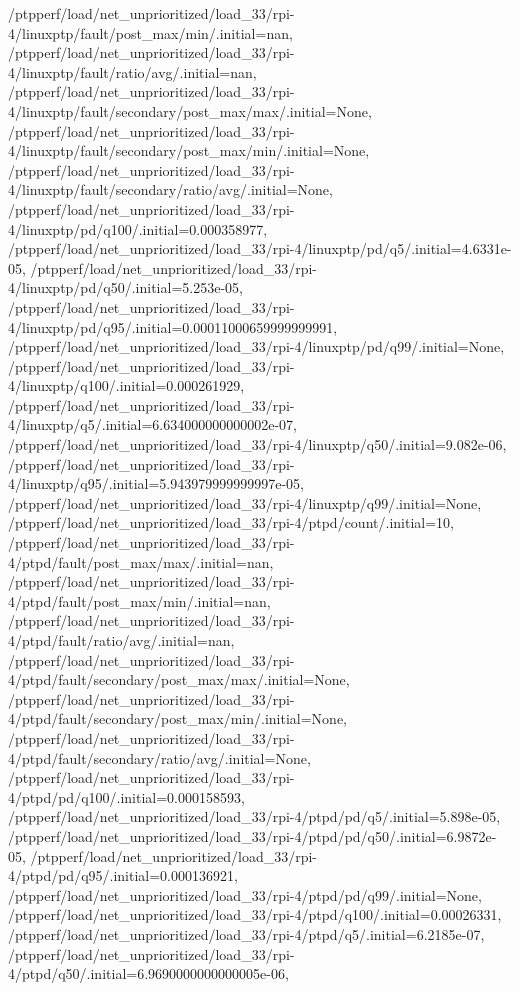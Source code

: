 {    /ptpperf/load/net_unprioritized/load_33/rpi-4/linuxptp/fault/post_max/min/.initial=nan,
    /ptpperf/load/net_unprioritized/load_33/rpi-4/linuxptp/fault/ratio/avg/.initial=nan,
    /ptpperf/load/net_unprioritized/load_33/rpi-4/linuxptp/fault/secondary/post_max/max/.initial=None,
    /ptpperf/load/net_unprioritized/load_33/rpi-4/linuxptp/fault/secondary/post_max/min/.initial=None,
    /ptpperf/load/net_unprioritized/load_33/rpi-4/linuxptp/fault/secondary/ratio/avg/.initial=None,
    /ptpperf/load/net_unprioritized/load_33/rpi-4/linuxptp/pd/q100/.initial=0.000358977,
    /ptpperf/load/net_unprioritized/load_33/rpi-4/linuxptp/pd/q5/.initial=4.6331e-05,
    /ptpperf/load/net_unprioritized/load_33/rpi-4/linuxptp/pd/q50/.initial=5.253e-05,
    /ptpperf/load/net_unprioritized/load_33/rpi-4/linuxptp/pd/q95/.initial=0.00011000659999999991,
    /ptpperf/load/net_unprioritized/load_33/rpi-4/linuxptp/pd/q99/.initial=None,
    /ptpperf/load/net_unprioritized/load_33/rpi-4/linuxptp/q100/.initial=0.000261929,
    /ptpperf/load/net_unprioritized/load_33/rpi-4/linuxptp/q5/.initial=6.634000000000002e-07,
    /ptpperf/load/net_unprioritized/load_33/rpi-4/linuxptp/q50/.initial=9.082e-06,
    /ptpperf/load/net_unprioritized/load_33/rpi-4/linuxptp/q95/.initial=5.943979999999997e-05,
    /ptpperf/load/net_unprioritized/load_33/rpi-4/linuxptp/q99/.initial=None,
    /ptpperf/load/net_unprioritized/load_33/rpi-4/ptpd/count/.initial=10,
    /ptpperf/load/net_unprioritized/load_33/rpi-4/ptpd/fault/post_max/max/.initial=nan,
    /ptpperf/load/net_unprioritized/load_33/rpi-4/ptpd/fault/post_max/min/.initial=nan,
    /ptpperf/load/net_unprioritized/load_33/rpi-4/ptpd/fault/ratio/avg/.initial=nan,
    /ptpperf/load/net_unprioritized/load_33/rpi-4/ptpd/fault/secondary/post_max/max/.initial=None,
    /ptpperf/load/net_unprioritized/load_33/rpi-4/ptpd/fault/secondary/post_max/min/.initial=None,
    /ptpperf/load/net_unprioritized/load_33/rpi-4/ptpd/fault/secondary/ratio/avg/.initial=None,
    /ptpperf/load/net_unprioritized/load_33/rpi-4/ptpd/pd/q100/.initial=0.000158593,
    /ptpperf/load/net_unprioritized/load_33/rpi-4/ptpd/pd/q5/.initial=5.898e-05,
    /ptpperf/load/net_unprioritized/load_33/rpi-4/ptpd/pd/q50/.initial=6.9872e-05,
    /ptpperf/load/net_unprioritized/load_33/rpi-4/ptpd/pd/q95/.initial=0.000136921,
    /ptpperf/load/net_unprioritized/load_33/rpi-4/ptpd/pd/q99/.initial=None,
    /ptpperf/load/net_unprioritized/load_33/rpi-4/ptpd/q100/.initial=0.00026331,
    /ptpperf/load/net_unprioritized/load_33/rpi-4/ptpd/q5/.initial=6.2185e-07,
    /ptpperf/load/net_unprioritized/load_33/rpi-4/ptpd/q50/.initial=6.9690000000000005e-06,
}

